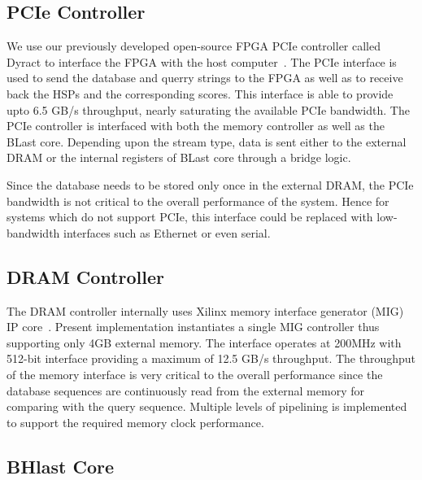 \subsection{PCIe Controller}
We use our previously developed open-source FPGA PCIe controller called Dyract to interface the FPGA with the host computer~\cite{Vipin2014}.
The PCIe interface is used to send the database and querry strings to the FPGA as well as to receive back the HSPs and the corresponding scores.
This interface is able to provide upto 6.5 GB/s throughput, nearly saturating the available PCIe bandwidth.
The PCIe controller is interfaced with both the memory controller as well as the BLast core.
Depending upon the stream type, data is sent either to the external DRAM or the internal registers of BLast core through a bridge logic.

Since the database needs to be stored only once in the external DRAM, the PCIe bandwidth is not critical to the overall performance of the system. Hence for systems which do not support PCIe, this interface could be replaced with low-bandwidth interfaces such as Ethernet or even serial.

\subsection{DRAM Controller}
The DRAM controller internally uses Xilinx memory interface generator (MIG) IP core~\cite{mig2018}. 
Present implementation instantiates a single MIG controller thus supporting only 4GB external memory.
The interface operates at 200MHz with 512-bit interface providing a maximum of 12.5 GB/s throughput.
The throughput of the memory interface is very critical to the overall performance since the database sequences are continuously read from the external memory for comparing with the query sequence.
Multiple levels of pipelining is implemented to support the required memory clock performance.

\subsection{BHlast Core}

